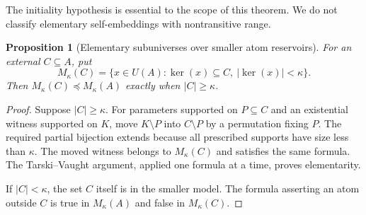 \documentclass[11pt,letterpaper]{article}
\numberwithin{equation}{section}
\theoremstyle{plain}
\newtheorem{proposition}[proposition]{Proposition}
\theoremstyle{definition}
\theoremstyle{remark}
\newcommand{\kerat}{\operatorname{ker}}
\begin{document}
The initiality hypothesis is essential to the scope of this theorem. We do not classify elementary self-embeddings with nontransitive range.

\begin{proposition}[Elementary subuniverses over smaller atom reservoirs]\label{nee:prop:subuniverse}
For an external $C\subseteq A$, put
\[
M_\kappa(C)=\{x\in U(A):\kerat(x)\subseteq C,\ |\kerat(x)|<\kappa\}.
\]
Then $M_\kappa(C)\preccurlyeq M_\kappa(A)$ exactly when $|C|\geq\kappa$.
\end{proposition}
\begin{proof}
Suppose $|C|\geq\kappa$. For parameters supported on $P\subseteq C$ and an existential witness supported on $K$, move $K\setminus P$ into $C\setminus P$ by a permutation fixing $P$. The required partial bijection extends because all prescribed supports have size less than $\kappa$. The moved witness belongs to $M_\kappa(C)$ and satisfies the same formula. The Tarski--Vaught argument, applied one formula at a time, proves elementarity.

If $|C|<\kappa$, the set $C$ itself is in the smaller model. The formula asserting an atom outside $C$ is true in $M_\kappa(A)$ and false in $M_\kappa(C)$.
\end{proof}
\end{document}
